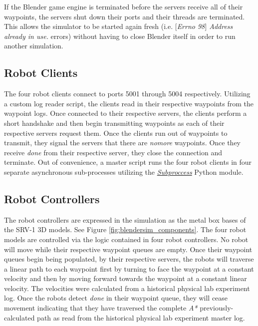 If the Blender game engine is terminated before the servers receive all of their waypoints, the servers shut down their ports and their threads are terminated. This allows the simulator to be started again fresh (i.e. \textit{$[$Errno 98$]$ Address already in use.} errors) without having to close Blender itself in order to run another simulation.

\subsection{Robot Clients}


The four robot clients connect to ports 5001 through 5004 respectively. Utilizing a custom log reader script, the clients read in their respective waypoints from the waypoint logs. Once connected to their respective servers, the clients perform a short handshake and then begin transmitting waypoints as each of their respective servers request them. Once the clients run out of waypoints to transmit, they signal the servers that there are \textit{nomore} waypoints. Once they receive \textit{done} from their respective server, they close the connection and terminate. Out of convenience, a master script runs the four robot clients in four separate asynchronous sub-processes utilizing the \href{http://docs.python.org/2/library/subprocess.html}{\textit{Subproccess}} Python module.

\subsection{Robot Controllers}


The robot controllers are expressed in the simulation as the metal box bases of the SRV-1 3D models. See Figure \ref{fig:blendersim_components}. The four robot models are controlled via the logic contained in four robot controllers.
No robot will move while their respective waypoint queues are empty. Once their waypoint queues begin being populated, by their respective servers, the robots will traverse a linear path to each waypoint first by turning to face the waypoint at a constant velocity and then by moving forward towards the waypoint at a constant linear velocity. The velocities were calculated from a historical physical lab experiment log. Once the robots detect \textit{done} in their waypoint queue, they will cease movement indicating that they have traversed the complete \textit{A*} previously-calculated path as read from the historical physical lab experiment master log.

